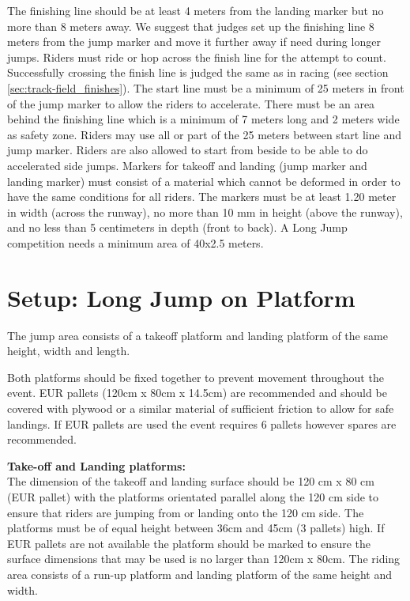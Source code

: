 The finishing line should be at least 4 meters from the landing marker but no more than 8 meters away.
We suggest that judges set up the finishing line 8 meters from the jump marker and move it further away if need during longer jumps.
Riders must ride or hop across the finish line for the attempt to count.
Successfully crossing the finish line is judged the same as in racing (see section \ref{sec:track-field_finishes}).
The start line must be a minimum of 25 meters in front of the jump marker to allow the riders to accelerate.
There must be an area behind the finishing line which is a minimum of 7 meters long and 2 meters wide as safety zone.
Riders may use all or part of the 25 meters between start line and jump marker.
Riders are also allowed to start from beside to be able to do accelerated side jumps.
Markers for takeoff and landing (jump marker and landing marker) must consist of a material which cannot be deformed in order to have the same conditions for all riders.
The markers must be at least 1.20 meter in width (across the runway), no more than 10 mm in height (above the runway), and no less than 5 centimeters in depth (front to back).
A Long Jump competition needs a minimum area of 40x2.5 meters.

\section{Setup: Long Jump on Platform}
The jump area consists of a takeoff platform and landing platform of the same height, width and length.

Both platforms should be fixed together to prevent movement throughout the event.
EUR pallets (120cm x 80cm x 14.5cm) are recommended and should be covered with plywood or a similar material of sufficient friction to allow for safe landings.
If EUR pallets are used the event requires 6 pallets however spares are recommended.

\textbf{Take-off and Landing platforms:}\\
The dimension of the takeoff and landing surface should be 120 cm x 80 cm (EUR pallet) with the platforms orientated parallel along the 120 cm side to ensure that riders are jumping from or landing onto the 120 cm side.
The platforms must be of equal height between 36cm and 45cm (3 pallets) high.
If EUR pallets are not available the platform should be marked to ensure the surface dimensions that may be used is no larger than 120cm x 80cm.
The riding area consists of a run-up platform and landing platform of the same height and width.
